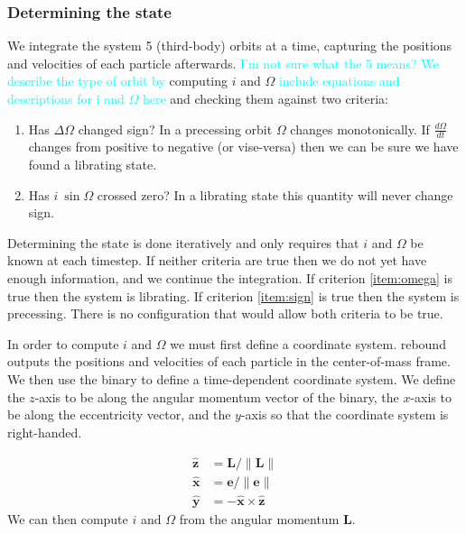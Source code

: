 \documentclass[twocolumn]{aastex631}
\newcommand{\RGM}[1]{\textcolor{cyan}{#1}}
\begin{document}
\subsubsection{Determining the state}
\label{subsubsec:state}
We integrate the system 5 (third-body) orbits at a time, capturing the positions and velocities of each particle afterwards. \RGM{I'm not sure what the 5 means?}
\RGM{We describe the type of orbit by}
computing $i$ and $\Omega$ \RGM{include equations and descriptions for i and $\Omega$ here} and checking them against
two criteria:
\begin{enumerate}
    \item Has $\Delta\Omega$ changed sign? In a precessing orbit $\Omega$ changes monotonically. If 
    $\frac{d\Omega}{dt}$ changes from positive to negative (or vise-versa) then we can be sure we have found a librating state.
    \label{item:omega}
    \item Has $i~\sin{\Omega}$ crossed zero? In a librating state this quantity will never change sign. 
    \label{item:sign}
\end{enumerate}
 Determining the state is done iteratively and only requires that $i$ and $\Omega$
be known at each timestep. If neither criteria are true then we do not yet have enough information, and we continue the integration.
If criterion \ref{item:omega} is true then the system is librating. If criterion \ref{item:sign} is true then the system is precessing.
There is no configuration that would allow both criteria to be true.

In order to compute $i$ and $\Omega$ we must first define a coordinate system. {\sc rebound} outputs the positions and
velocities of each particle in the center-of-mass frame. We then use the binary to define a time-dependent coordinate system.
We define the $z$-axis to be along the angular momentum vector of the binary, the $x$-axis to be along the eccentricity vector, and the
$y$-axis so that the coordinate system is right-handed.

\begin{equation}
\begin{aligned}
    \hat{\bm{z}} & = \bm{L}/\|\bm{L}\| \\
    \hat{\bm{x}} & = \bm{e}/\|\bm{e}\| \\
    \hat{\bm{y}} & = - \hat{\bm{x}} \times \hat{\bm{z}}
    \label{eq:coords}
\end{aligned}
\end{equation}
We can then compute $i$ and $\Omega$ from the angular momentum $\bm{L}$.
\end{document}
